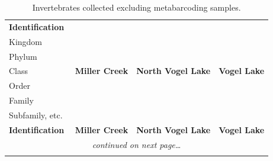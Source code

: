 \begin{longtable}{p{3in}p{1.2in}p{1.2in}p{1.2in}}
\caption{Invertebrates collected excluding metabarcoding samples.}\label{tableids}\\

\hline
\hline
\textbf{Identification}&&&\\ 
\hspace{0em}Kingdom&&&\\
\hspace{0.8em}Phylum&&&\\
\hspace{1.6em}Class& \textbf{Miller Creek} & \textbf{North Vogel Lake} & \textbf{Vogel Lake}\\
\hspace{2.4em}Order&&&\\
\hspace{3.2em}Family&&&\\
\hspace{4.0em}Subfamily, etc.\ &&&\\
\hline
\endfirsthead

\hline
\textbf{Identification} & \textbf{Miller Creek} & \textbf{North Vogel Lake} & \textbf{Vogel Lake}\\
\hline
\endhead

\multicolumn{4}{c}{\textit{continued on next page\ldots}}\\
\hline
\endfoot

\hline
\hline
\endlastfoot



\end{longtable}

